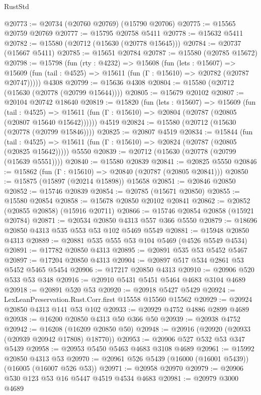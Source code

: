 \begin{lexlean}{RustStd}
\begin{coremodule}
@20773 := @20734 (@20760 @20769) (@15790 @20706)
@20775 := @15565 @20759 @20769
@20777 := @15795 @20758 @5411
@20778 := @15632 @5411
@20782 := @15580 (@20712 (@15630 (@20778 @15645)))
@20784 := @20737 (@15667 @5411)
@20785 := @15651 @20784
@20787 := @15580 (@20785 @15672)
@20798 := @15798
    (fun (rty : @4232) =>
    @15608
      (fun (lets : @15607) =>
      @15609 (fun (tail : @4525) => @15611 (fun (Γ : @15610) => @20782 (@20787 @20747)))))
    @4308
@20799 := @15636 @4308
@20804 := @15580 (@20712 (@15630 (@20778 (@20799 @15644))))
@20805 := @15679 @20102
@20807 := @20104 @20742 @18640
@20819 := @15820
    (fun (lets : @15607) =>
    @15609
      (fun (tail : @4525) =>
      @15611 (fun (Γ : @15610) => @20804 (@20787 (@20805 (@20807 @15640 @15642))))))
    @4519
@20824 := @15580 (@20712 (@15630 (@20778 (@20799 @15846))))
@20825 := @20807 @4519
@20834 := @15844
    (fun (tail : @4525) => @15611 (fun (Γ : @15610) => @20824 (@20787 (@20805 (@20825 @15642)))))
    @5550
@20839 := @20712 (@15630 (@20778 (@20799 (@15639 @5551))))
@20840 := @15580 @20839
@20841 := @20825 @5550
@20846 := @15862 (fun (Γ : @15610) => @20840 (@20787 (@20805 @20841)))
@20850 := @15875 (@15897 (@20214 @15898)) @15658
@20851 := @20846 @20850
@20852 := @15746 @20839
@20854 := @20785 (@15671 @20850)
@20855 := @15580 @20854
@20858 := @15678 @20850 @20102 @20841
@20862 := @20852 (@20855 @20858) (@15916 @20711)
@20866 := @15746 @20854 @20858 (@15921 @20784)
@20871 := @20534 @20850 @4313 @557 @366 @5550
@20879 := @18696 @20850 @4313 @535 @553 @53 @102 @5469 @5549
@20881 := @15948 @20850 @4313
@20889 := @20881 @535 @555 @53 @104 @5469 (@4526 @5549 @4534)
@20891 := @17782 @20850 @4313
@20895 := @20891 @535 @53 @5452 @5467
@20897 := @17204 @20850 @4313
@20904 := @20897 @517 @534 @2861 @53 @5452 @5465 @5454
@20906 := @17217 @20850 @4313
@20910 := @20906 @520 @533 @53 @348
@20916 := @20910 @5431 @5451 @5464 @4683 @3104 @4689
@20918 := @20891 @520 @53
@20920 := @20918 @5427 @5429
@20924 := LexLeanPreservation.Rust.Corr.first @15558 @15560 @15562
@20929 := @20924 @20850 @4313 @141 @53 @102
@20933 := @20929 @4752 @4886 @2899 @4689
@20938 := @16200 @20850 @4313 @50 @366 @50
@20939 := @20938 @4752
@20942 := @16208 (@16209 @20850 @50)
@20948 := @20916 (@20920 (@20933 (@20939 @20942 @17808) @18770))
@20953 := @20906 @527 @532 @53 @347 @5439
@20958 := @20953 @5450 @5463 @4683 @3108 @4689
@20961 := @15992 @20850 @4313 @53
@20970 := @20961 @526 @5439 (@16000 (@16001 @5439)) (@16005 (@16007 @526 @53))
@20971 := @20958 @20970
@20979 := @20906 @530 @123 @53 @16 @5447 @4519 @4534 @4683
@20981 := @20979 @3000 @4689

\end{coremodule}
\end{lexlean}
